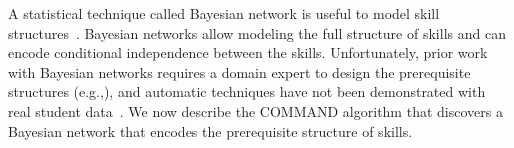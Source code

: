 \documentclass{edm_template}
\newcommand{\hl}[1]{\colorbox{yellow}{#1}}
\begin{document}

A statistical technique called Bayesian network is useful to model skill structures~\cite{mislevy2000bayes}. 
Bayesian networks allow  modeling the full structure of skills and can encode conditional independence  between the skills.
Unfortunately, prior work with Bayesian networks requires a domain expert to design the prerequisite structures (e.g.,\cite{kaser2014beyond}),
and automatic techniques have not been demonstrated with real student data~\cite{scheines2014discovering}.
We now describe the COMMAND algorithm that discovers a Bayesian network that encodes the prerequisite structure of skills.

\end{document}

